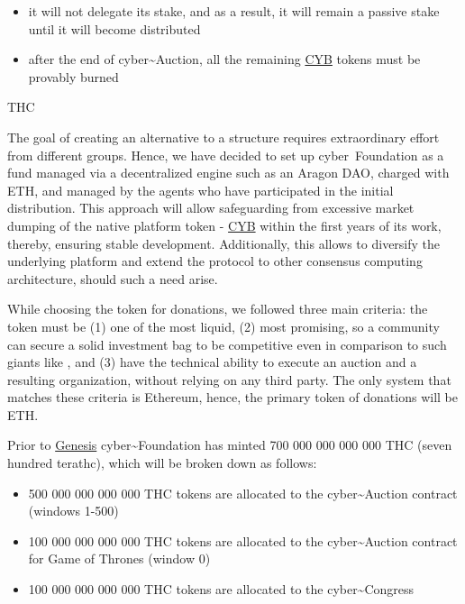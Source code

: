 \documentclass[8pt,oneside]{amsart}
\makeatletter
\newcommand{\linkred}[2]{\href{#1}{\color{red}{#2}}}
\renewcommand\subsection{\@startsection{subsection}
                                    {2}{\z@}
                                    {-3.25ex\@plus -1ex \@minus -.2ex}
                                    {0ex \@plus .2ex}
                                    {\play\Large}
                        }
\newcommand{\titleSection}[1]{\subsection{#1}}
\newenvironment{Figure}
  {\par\medskip\noindent\minipage{\linewidth}}
  {\endminipage\par\medskip}
\makeatother
\begin{document}
\begin{itemize}
\item it will not delegate its stake, and as a result, it will remain a passive stake until it will become distributed
\item after the end of cyber\~{}Auction, all the remaining {\hyperref[cyb]{CYB}} tokens must be provably burned
\end{itemize}

\titleSection{THC}\label{thc}

The goal of creating an alternative to a \linkred{https://google.com}{Google-like} structure requires extraordinary effort from different groups. Hence, we have decided to set up cyber~Foundation as a fund managed via a decentralized engine such as an Aragon DAO, charged with ETH, and managed by the agents who have participated in the initial distribution. This approach will allow safeguarding from excessive market dumping of the native platform token - {\hyperref[cyb]{CYB}} within the first years of its work, thereby, ensuring stable development. Additionally, this allows to diversify the underlying platform and extend the protocol to other consensus computing architecture, should such a need arise.

While choosing the token for donations, we followed three main criteria: the token must be (1) one of the most liquid, (2) most promising, so a community can secure a solid investment bag to be competitive even in comparison to such giants like \linkred{https://google.com}{Google}, and (3) have the technical ability to execute an auction and a resulting organization, without relying on any third party. The only system that matches these criteria is Ethereum, hence, the primary token of donations will be ETH.

Prior to \hyperlink{genesis}{Genesis} cyber\~{}Foundation has minted 700 000 000 000 000 THC (seven hundred terathc), which will be broken down as follows:

\begin{itemize}
\item 500 000 000 000 000 THC tokens are allocated to the cyber\~{}Auction contract (windows 1-500)
\item 100 000 000 000 000 THC tokens are allocated to the cyber\~{}Auction contract for Game of Thrones (window 0)
\item 100 000 000 000 000 THC tokens are allocated to the cyber\~{}Congress
\end{itemize}

\begin{Figure}
 \centering
 
\end{Figure}
\end{document}
